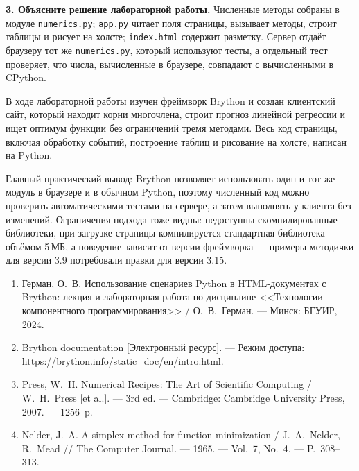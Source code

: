 \documentclass[14pt,a4paper]{extarticle}
\begin{document}
\textbf{3. Объясните решение лабораторной работы.} Численные методы собраны в модуле
\texttt{numerics.py}; \texttt{app.py} читает поля страницы, вызывает методы, строит
таблицы и рисует на холсте; \texttt{index.html} содержит разметку. Сервер отдаёт
браузеру тот же \texttt{numerics.py}, который используют тесты, а отдельный тест
проверяет, что числа, вычисленные в браузере, совпадают с вычисленными в CPython.


В ходе лабораторной работы изучен фреймворк Brython и создан клиентский сайт, который
находит корни многочлена, строит прогноз линейной регрессии и ищет оптимум функции без
ограничений тремя методами. Весь код страницы, включая обработку событий, построение
таблиц и рисование на холсте, написан на Python.

Главный практический вывод: Brython позволяет использовать один и тот же модуль в
браузере и в обычном Python, поэтому численный код можно проверить автоматическими
тестами на сервере, а затем выполнять у клиента без изменений. Ограничения подхода тоже
видны: недоступны скомпилированные библиотеки, при загрузке страницы компилируется
стандартная библиотека объёмом 5\,МБ, а поведение зависит от версии фреймворка ---
примеры методички для версии 3.9 потребовали правки для версии 3.15.


\begin{enumerate}
\item Герман, О.~В. Использование сценариев Python в HTML-документах с Brython:
лекция и лабораторная работа по дисциплине <<Технологии компонентного
программирования>> / О.~В.~Герман. --- Минск: БГУИР, 2024.
\item Brython documentation [Электронный ресурс]. --- Режим доступа:
\url{https://brython.info/static_doc/en/intro.html}.
\item Press, W.~H. Numerical Recipes: The Art of Scientific Computing /
W.~H.~Press [et al.]. --- 3rd ed. --- Cambridge: Cambridge University Press, 2007. ---
1256~p.
\item Nelder, J.~A. A simplex method for function minimization / J.~A.~Nelder,
R.~Mead // The Computer Journal. --- 1965. --- Vol.~7, No.~4. --- P.~308--313.
\end{enumerate}
\end{document}
